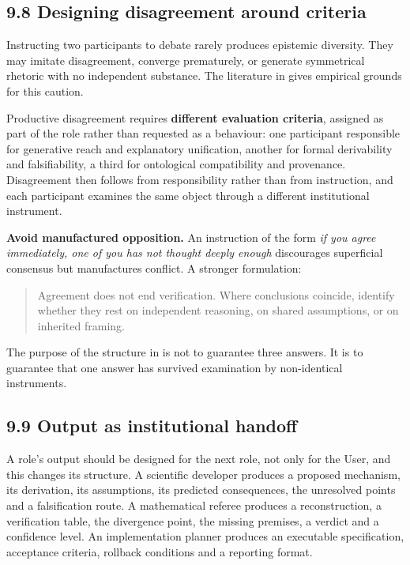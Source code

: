 \subsection*{9.8 Designing disagreement around criteria}
\label{sec:en:9.8}

Instructing two participants to debate rarely produces epistemic diversity. They may imitate disagreement, converge prematurely, or generate symmetrical rhetoric with no independent substance. The literature in  gives empirical grounds for this caution.

Productive disagreement requires \textbf{different evaluation criteria}, assigned as part of the role rather than requested as a behaviour: one participant responsible for generative reach and explanatory unification, another for formal derivability and falsifiability, a third for ontological compatibility and provenance. Disagreement then follows from responsibility rather than from instruction, and each participant examines the same object through a different institutional instrument.

\textbf{Avoid manufactured opposition.} An instruction of the form \emph{if you agree immediately, one of you has not thought deeply enough} discourages superficial consensus but manufactures conflict. A stronger formulation:

\begin{quote}
Agreement does not end verification. Where conclusions coincide, identify whether they rest on independent reasoning, on shared assumptions, or on inherited framing.
\end{quote}
The purpose of the structure in  is not to guarantee three answers. It is to guarantee that one answer has survived examination by non-identical instruments.


\subsection*{9.9 Output as institutional handoff}
\label{sec:en:9.9}

A role's output should be designed for the next role, not only for the User, and this changes its structure. A scientific developer produces a proposed mechanism, its derivation, its assumptions, its predicted consequences, the unresolved points and a falsification route. A mathematical referee produces a reconstruction, a verification table, the divergence point, the missing premises, a verdict and a confidence level. An implementation planner produces an executable specification, acceptance criteria, rollback conditions and a reporting format.

